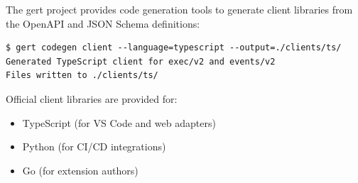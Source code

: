 The gert project provides code generation tools to generate client libraries
from the OpenAPI and JSON Schema definitions:

\begin{verbatim}
$ gert codegen client --language=typescript --output=./clients/ts/
Generated TypeScript client for exec/v2 and events/v2
Files written to ./clients/ts/
\end{verbatim}

Official client libraries are provided for:

\begin{itemize}
  \item TypeScript (for VS Code and web adapters)
  \item Python (for CI/CD integrations)
  \item Go (for extension authors)
\end{itemize}
